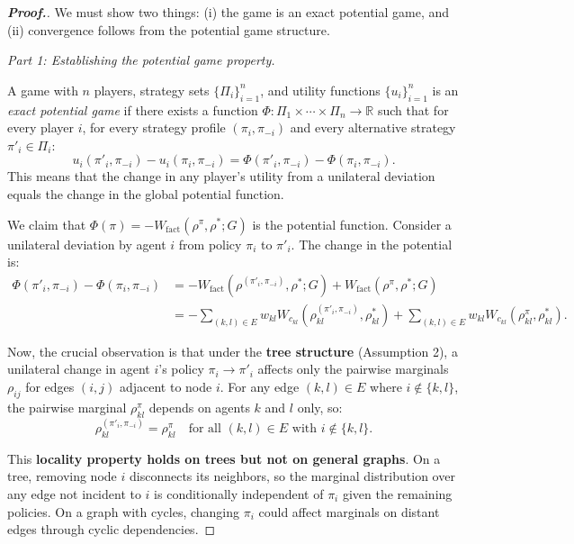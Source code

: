 \documentclass[12pt,a4paper,oneside]{report}
\theoremstyle{definition}
\theoremstyle{remark}
\begin{document}
\begin{proof}[\textbf{Proof.}]
We must show two things: (i) the game is an exact potential game, and (ii) convergence follows from the potential game structure.

\medskip
\noindent\textit{Part 1: Establishing the potential game property.}

A game with $n$ players, strategy sets $\{\Pi_i\}_{i=1}^n$, and utility functions $\{u_i\}_{i=1}^n$ is an \emph{exact potential game} if there exists a function $\Phi : \Pi_1 \times \cdots \times \Pi_n \to \mathbb{R}$ such that for every player $i$, for every strategy profile $(\pi_i, \pi_{-i})$ and every alternative strategy $\pi'_i \in \Pi_i$:
\[
u_i(\pi'_i, \pi_{-i}) - u_i(\pi_i, \pi_{-i}) = \Phi(\pi'_i, \pi_{-i}) - \Phi(\pi_i, \pi_{-i}).
\]
This means that the change in any player's utility from a unilateral deviation equals the change in the global potential function.

We claim that $\Phi(\pi) = -W_{\text{fact}}(\rho^\pi, \rho^*; G)$ is the potential function. Consider a unilateral deviation by agent $i$ from policy $\pi_i$ to $\pi'_i$. The change in the potential is:
\begin{align*}
\Phi(\pi'_i, \pi_{-i}) - \Phi(\pi_i, \pi_{-i}) &= -W_{\text{fact}}(\rho^{(\pi'_i, \pi_{-i})}, \rho^*; G) + W_{\text{fact}}(\rho^\pi, \rho^*; G) \\
&= -\sum_{(k,l) \in E} w_{kl} W_{c_{kl}}(\rho^{(\pi'_i, \pi_{-i})}_{kl}, \rho^*_{kl}) + \sum_{(k,l) \in E} w_{kl} W_{c_{kl}}(\rho^\pi_{kl}, \rho^*_{kl}).
\end{align*}

Now, the crucial observation is that under the \textbf{tree structure} (Assumption 2), a unilateral change in agent $i$'s policy $\pi_i \to \pi'_i$ affects only the pairwise marginals $\rho_{ij}$ for edges $(i,j)$ adjacent to node $i$. For any edge $(k,l) \in E$ where $i \notin \{k,l\}$, the pairwise marginal $\rho^\pi_{kl}$ depends on agents $k$ and $l$ only, so:
\[
\rho^{(\pi'_i, \pi_{-i})}_{kl} = \rho^\pi_{kl} \quad \text{for all } (k,l) \in E \text{ with } i \notin \{k,l\}.
\]

This \textbf{locality property holds on trees but not on general graphs}. On a tree, removing node $i$ disconnects its neighbors, so the marginal distribution over any edge not incident to $i$ is conditionally independent of $\pi_i$ given the remaining policies. On a graph with cycles, changing $\pi_i$ could affect marginals on distant edges through cyclic dependencies.


\end{proof}
\end{document}

